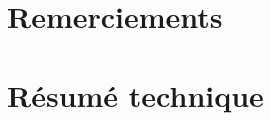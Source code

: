 \chapter{Remerciements}

\vspace*{\fill}

    \lipsum[1-2]

    
  \vspace*{\fill}
\vfill


\chapter{Résumé technique}

\vspace*{\fill}

    \lipsum[1-2]
    
 \vspace*{\fill}
\vfill